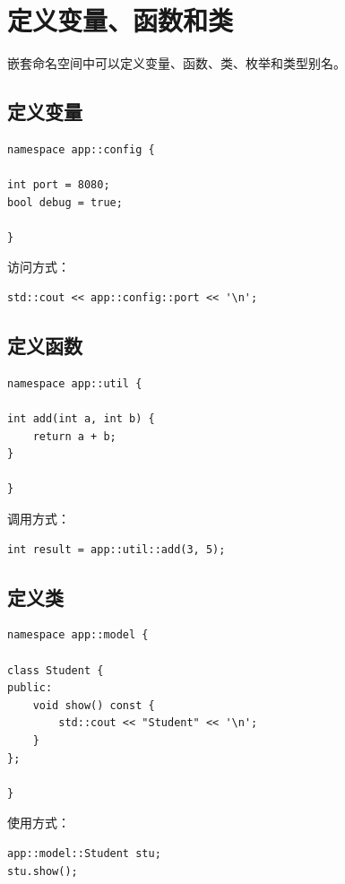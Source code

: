 \documentclass[UTF8,12pt,a4paper]{ctexart}
\begin{document}
\section{定义变量、函数和类}

嵌套命名空间中可以定义变量、函数、类、枚举和类型别名。

\subsection{定义变量}

\begin{lstlisting}
namespace app::config {

int port = 8080;
bool debug = true;

}
\end{lstlisting}

访问方式：

\begin{lstlisting}
std::cout << app::config::port << '\n';
\end{lstlisting}

\subsection{定义函数}

\begin{lstlisting}
namespace app::util {

int add(int a, int b) {
    return a + b;
}

}
\end{lstlisting}

调用方式：

\begin{lstlisting}
int result = app::util::add(3, 5);
\end{lstlisting}

\subsection{定义类}

\begin{lstlisting}
namespace app::model {

class Student {
public:
    void show() const {
        std::cout << "Student" << '\n';
    }
};

}
\end{lstlisting}

使用方式：

\begin{lstlisting}
app::model::Student stu;
stu.show();
\end{lstlisting}
\end{document}
